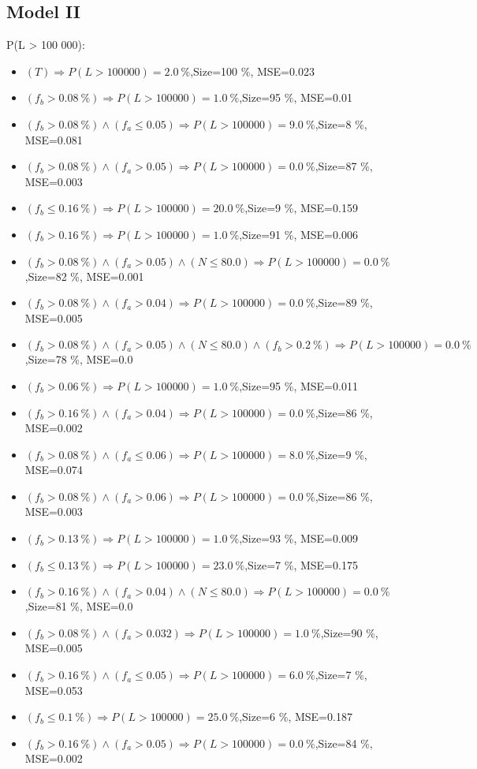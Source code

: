 \documentclass[numbered]{CSL}
\begin{document}
\subsection{Model II}
P(L > 100 000):
\begin{itemize}
\item $(T) \Rightarrow P(L > 100 000) = 2.0~\%$,\hfill Size=100 \%, MSE=0.023
\item $(f_b > 0.08~\%) \Rightarrow P(L > 100 000) = 1.0~\%$,\hfill Size=95 \%, MSE=0.01
\item $(f_b > 0.08~\%) \land (f_a \leq 0.05) \Rightarrow P(L > 100 000) = 9.0~\%$,\hfill Size=8 \%, MSE=0.081
\item $(f_b > 0.08~\%) \land (f_a > 0.05) \Rightarrow P(L > 100 000) = 0.0~\%$,\hfill Size=87 \%, MSE=0.003
\item $(f_b \leq 0.16~\%) \Rightarrow P(L > 100 000) = 20.0~\%$,\hfill Size=9 \%, MSE=0.159
\item $(f_b > 0.16~\%) \Rightarrow P(L > 100 000) = 1.0~\%$,\hfill Size=91 \%, MSE=0.006
\item $(f_b > 0.08~\%) \land (f_a > 0.05) \land (N \leq 80.0) \Rightarrow P(L > 100 000) = 0.0~\%$,\hfill Size=82 \%, MSE=0.001
\item $(f_b > 0.08~\%) \land (f_a > 0.04) \Rightarrow P(L > 100 000) = 0.0~\%$,\hfill Size=89 \%, MSE=0.005
\item $(f_b > 0.08~\%) \land (f_a > 0.05) \land (N \leq 80.0) \land (f_b > 0.2~\%) \Rightarrow P(L > 100 000) = 0.0~\%$,\hfill Size=78 \%, MSE=0.0
\item $(f_b > 0.06~\%) \Rightarrow P(L > 100 000) = 1.0~\%$,\hfill Size=95 \%, MSE=0.011
\item $(f_b > 0.16~\%) \land (f_a > 0.04) \Rightarrow P(L > 100 000) = 0.0~\%$,\hfill Size=86 \%, MSE=0.002
\item $(f_b > 0.08~\%) \land (f_a \leq 0.06) \Rightarrow P(L > 100 000) = 8.0~\%$,\hfill Size=9 \%, MSE=0.074
\item $(f_b > 0.08~\%) \land (f_a > 0.06) \Rightarrow P(L > 100 000) = 0.0~\%$,\hfill Size=86 \%, MSE=0.003
\item $(f_b > 0.13~\%) \Rightarrow P(L > 100 000) = 1.0~\%$,\hfill Size=93 \%, MSE=0.009
\item $(f_b \leq 0.13~\%) \Rightarrow P(L > 100 000) = 23.0~\%$,\hfill Size=7 \%, MSE=0.175
\item $(f_b > 0.16~\%) \land (f_a > 0.04) \land (N \leq 80.0) \Rightarrow P(L > 100 000) = 0.0~\%$,\hfill Size=81 \%, MSE=0.0
\item $(f_b > 0.08~\%) \land (f_a > 0.032) \Rightarrow P(L > 100 000) = 1.0~\%$,\hfill Size=90 \%, MSE=0.005
\item $(f_b > 0.16~\%) \land (f_a \leq 0.05) \Rightarrow P(L > 100 000) = 6.0~\%$,\hfill Size=7 \%, MSE=0.053
\item $(f_b \leq 0.1~\%) \Rightarrow P(L > 100 000) = 25.0~\%$,\hfill Size=6 \%, MSE=0.187
\item $(f_b > 0.16~\%) \land (f_a > 0.05) \Rightarrow P(L > 100 000) = 0.0~\%$,\hfill Size=84 \%, MSE=0.002
\end{itemize}
\end{document}
